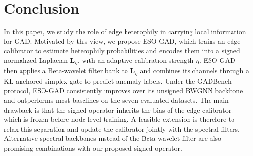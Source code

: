 \section{Conclusion}
In this paper, we study the role of edge heterophily in carrying local information for GAD.
Motivated by this view, we propose ESO-GAD, which trains an edge calibrator to estimate heterophily probabilities and encodes them into a signed normalized Laplacian $\bm{L}_\eta$, with an adaptive calibration strength $\eta$.
ESO-GAD then applies a Beta-wavelet filter bank to $\bm{L}_\eta$ and combines its channels through a KL-anchored simplex gate to predict anomaly labels.
Under the GADBench protocol, ESO-GAD consistently improves over its unsigned BWGNN backbone and outperforms most baselines on the seven evaluated datasets.
The main drawback is that the signed operator inherits the bias of the edge calibrator, which is frozen before node-level training.
A feasible extension is therefore to relax this separation and update the calibrator jointly with the spectral filters.
Alternative spectral backbones instead of the Beta-wavelet filter are also promising combinations with our proposed signed operator.





